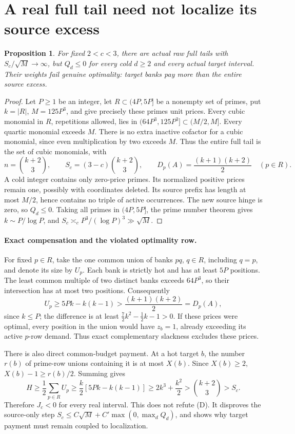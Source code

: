 \documentclass[11pt]{article}
\newtheorem{proposition}{Proposition}
\begin{document}
\section{A real full tail need not localize its source excess}
\begin{proposition}
For fixed $2<c<3$, there are actual raw full tails with
$S_c/\sqrt M\to\infty$, but $Q_d\le0$ for every cold $d\ge2$ and every
actual target interval. Their weights fail genuine optimality: target banks
pay more than the entire source excess.
\end{proposition}
\begin{proof}
Let $P\ge1$ be an integer, let $R\subset(4P,5P]$ be a nonempty set of
primes, put $k=|R|$, $M=125P^3$, and give precisely these primes unit
prices. Every cubic monomial in $R$, repetitions allowed, lies in
$(64P^3,125P^3]\subset(M/2,M]$. Every quartic monomial exceeds $M$.
There is no extra inactive cofactor for a cubic monomial, since even
multiplication by two exceeds $M$. Thus the entire full tail is the
set of cubic monomials, with
\[
 n=\binom{k+2}{3},\qquad S_c=(3-c)\binom{k+2}{3},\qquad
 D_p(A)=\frac{(k+1)(k+2)}2\quad(p\in R).\tag{1}
\]
A cold integer contains only zero-price primes. Its normalized positive
prices remain one, possibly with coordinates deleted. Its source prefix
has length at most $M/2$, hence contains no triple of active occurrences.
The new source hinge is zero, so $Q_d\le0$.
Taking all primes in $(4P,5P]$, the prime number theorem gives
$k\sim P/\log P$, and $S_c\asymp_c P^3/(\log P)^3\gg\sqrt M$.
\end{proof}

\paragraph{Exact compensation and the violated optimality row.}
For fixed $p\in R$, take the one common union of banks $pq$, $q\in R$,
including $q=p$, and denote its size by $U_p$. Each bank is strictly hot
and has at least $5P$ positions. The least common multiple of two distinct
banks exceeds $64P^3$, so their intersection has at most two positions.
Consequently
\[
 U_p\ge5Pk-k(k-1)>\frac{(k+1)(k+2)}2=D_p(A),\tag{2}
\]
since $k\le P$; the difference is at least
$\tfrac72k^2-\tfrac12k-1>0$.
If these prices were optimal, every position in the union would have
$z_b=1$, already exceeding its active $p$-row demand. Thus exact
complementary slackness excludes these prices.

There is also direct common-budget payment. At a hot target $b$, the
number $r(b)$ of prime-row unions containing it is at most $X(b)$.
Since $X(b)\ge2$, $X(b)-1\ge r(b)/2$. Summing gives
\[
 H\ge\frac12\sum_{p\in R}U_p
 \ge\frac{k}{2}[5Pk-k(k-1)]
 \ge2k^3+\frac{k^2}{2}>\binom{k+2}{3}>S_c.\tag{3}
\]
Therefore $J_c<0$ for every real interval. This does not refute (D).
It disproves the source-only step
$S_c\le C\sqrt M+C'\max(0,\max_dQ_d)$, and shows why target payment
must remain coupled to localization.
\end{document}
